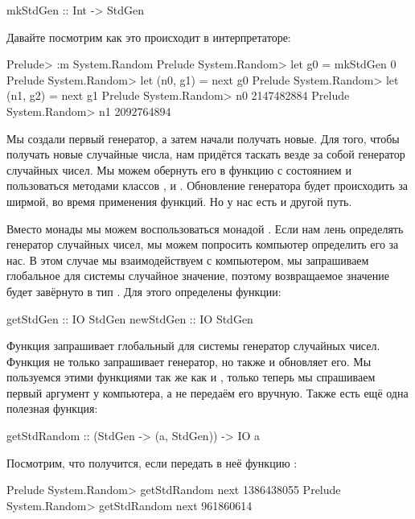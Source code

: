 \begin{code}
mkStdGen :: Int -> StdGen
\end{code}

Давайте посмотрим как это происходит в интерпретаторе:

\begin{code}
Prelude> :m System.Random
Prelude System.Random> let g0 = mkStdGen 0
Prelude System.Random> let (n0, g1) = next g0
Prelude System.Random> let (n1, g2) = next g1
Prelude System.Random> n0
2147482884
Prelude System.Random> n1
2092764894
\end{code}

Мы создали первый генератор, а затем начали получать новые.
Для того, чтобы получать новые случайные числа, нам придётся
таскать везде за собой генератор случайных чисел. Мы можем
обернуть его в функцию с состоянием и пользоваться 
методами классов ,  и .
Обновление генератора будет происходить за ширмой, во
время применения функций. Но у нас есть и другой путь.

Вместо монады  мы можем воспользоваться 
монадой . Если нам лень определять генератор случайных чисел, 
мы можем попросить компьютер определить его за нас. В этом случае мы 
взаимодействуем с компьютером, мы запрашиваем 
глобальное для системы случайное значение, поэтому
возвращаемое значение будет завёрнуто в тип . 
Для этого определены функции:

\begin{code}
getStdGen :: IO StdGen
newStdGen :: IO StdGen
\end{code}

Функция  запрашивает глобальный для системы 
генератор случайных чисел. Функция  не
только запрашивает генератор, но также и обновляет его.
Мы пользуемся этими функциями так же как и ,
только теперь мы спрашиваем первый аргумент у компьютера, а не передаём
его вручную. Также есть ещё одна полезная функция:

\begin{code}
getStdRandom    :: (StdGen -> (a, StdGen)) -> IO a
\end{code}

Посмотрим, что получится, если передать в неё функцию :

\begin{code}
Prelude System.Random> getStdRandom next 
1386438055
Prelude System.Random> getStdRandom next 
961860614
\end{code}


